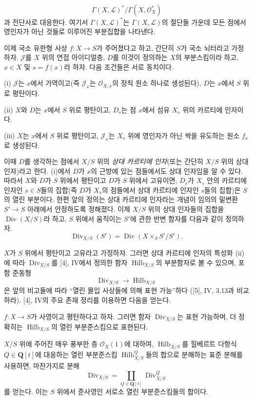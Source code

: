 \[
\Gamma(X,\mathcal L)^*/\Gamma(X,\mathcal O_X^*)
\]
과 전단사로 대응한다. 여기서 $\Gamma(X,\mathcal L)^*$는
$\Gamma(X,\mathcal L)$의 절단들 가운데 모든 점에서 영인자가 아닌 것들로
이루어진 부분집합을 나타낸다.

이제 국소 유한형 사상 $f:X\longrightarrow S$가 주어졌다고 하고, 간단히
$S$가 국소 뇌터라고 가정하자. $\mathcal J$를 $X$ 위의 연접 아이디얼층,
$D$를 이것이 정의하는 $X$의 부분스킴이라 하고, $x\in X$ 및 $s=f(x)$라
하자. 다음 조건들은 서로 동치이다.

\noindent (i) $\mathcal J$는 $x$에서 가역이고(즉 $\mathcal J_x$는
$\mathcal O_{X,x}$의 정칙 원소 하나로 생성된다), $D$는 $x$에서
$S$ 위로 평탄이다.

\noindent (ii) $X$와 $D$는 $x$에서 $S$ 위로 평탄이고, $D_s$는 점
$x$에서 섬유 $X_s$ 위의 카르티에 인자이다.

\noindent (iii) $X$는 $x$에서 $S$ 위로 평탄이고, $\mathcal J_x$는
$X_s$ 위에 영인자가 아닌 싹을 유도하는 원소 $f_x$로 생성된다.

이때 $D$를 생각하는 점에서 $X/S$ 위의 \emph{상대 카르티에 인자}(또는
간단히 $X/S$ 위의 상대 인자)라고 한다. (i)에서 $D$가 $x$의 근방에 있는
점들에서도 상대 인자임을 알 수 있다. 따라서 $X$와 $D$가 $S$ 위에서
평탄이고 $D$가 $S$ 위에서 고유이면, $D_s$가 $X_s$ 안의 카르티에
인자인 $s\in S$들의 집합(즉 $D$가 $X_s$의 점들에서 상대 카르티에
인자인 $s$들의 집합)은 $S$의 열린 부분이다. 한편 앞의 정의는 상대
카르티에 인자라는 개념이 임의의 밑변환 $S'\longrightarrow S$ 아래에서
안정하도록 정해졌다. 이제 $X/S$ 위의 상대 인자들의 집합을
$\operatorname{Div}(X/S)$라 하고, $S$ 위에서 움직이는 $S'$에 관한 반변
함자를 다음과 같이 정의하자.
\[
\operatorname{Div}_{X/S}(S')=
\operatorname{Div}(X\times_SS'/S').
\]

$X$가 $S$ 위에서 평탄이고 고유라고 가정하자. 그러면 상대 카르티에 인자의
특성화 (ii)에 따라 $\operatorname{Div}_{X/S}$를 [4], IV에서 정의한 함자
$\operatorname{Hilb}_{X/S}$의 부분함자로 볼 수 있으며, 포함 준동형
\[
\operatorname{Div}_{X/S}\longrightarrow\operatorname{Hilb}_{X/S}
\]
은 앞의 비고들에 따라 ``열린 몰입 사상들에 의해 표현 가능''하다
([5], IV, 3.13과 비교하라). [4], IV의 주요 존재 정리를 이용하면 다음을
얻는다.

 $f:X\longrightarrow S$가 사영이고 평탄하다고 하자.
그러면 함자 $\operatorname{Div}_{X/S}$는 표현 가능하며, 더 정확히는
$\operatorname{Hilb}_{X/S}$의 열린 부분준스킴으로 표현된다.

$X/S$ 위에 주어진 매우 풍부한 층 $\mathcal O_X(1)$에 대하여,
$\operatorname{Hilb}_{X/S}$를 힐베르트 다항식
$Q\in\mathbf Q[t]$에 대응하는 열린 부분준스킴
$\operatorname{Hilb}^{Q}_{X/S}$들의 합으로 분해하는 표준 분해를 사용하면,
마찬가지로 분해
\[
\operatorname{Div}_{X/S}=
\coprod_{Q\in\mathbf Q[t]}\operatorname{Div}^{Q}_{X/S}
\]
를 얻는다. 이는 $S$ 위에서 준사영인 서로소 열린 부분준스킴들의 합이다.

